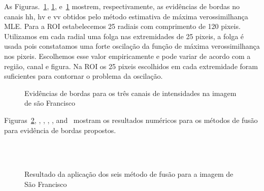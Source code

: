 As Figuras.~\ref{evidencias_sf_hh_hv_vv}, \ref{evidencias_sf_hh_hv_vv}, e~\ref{evidencias_sf_hh_hv_vv} mostrem, respectivamente, as evidências de bordas no canais $\text{hh}$, $\text{hv}$ e $\text{vv}$ obtidos pelo método estimativa de máxima verossimilhança MLE. Para a ROI estabelecemos 25 radiais com comprimento de 120 pixeis. Utilizamos em cada radial uma folga nas extremidades de  25 pixeis, a folga é usada pois constatamos uma forte oscilação da função de máxima verossimilhança nos pixeis. Escolhemos esse valor empiricamente e pode variar de acordo com a região, canal e figura. Na ROI os 25 pixeis escolhidos em cada extremidade foram suficientes para contornar o problema  da oscilação.
\begin{figure}[H]
	\centering
     \caption{Evidências de bordas para os três canais de intensidades na imagem de são Francisco}
     \label{evidencias_sf_hh_hv_vv} 
\end{figure}

Figuras~\ref{fusion_sf_met}, , , , , and~ mostram os resultados numéricos para os métodos de fusão para evidência de bordas propostos. 
\begin{figure}[htb]
	\centering
     \\
     \\
     \caption{Resultado da aplicação dos seis método de fusão para a imagem de São Francisco}
     \label{fusion_sf_met}
\end{figure}

